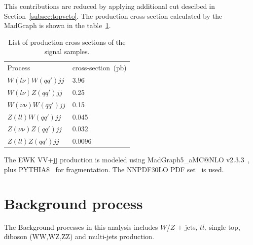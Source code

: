 This contributions are reduced by applying additional cut descibed in Section~\ref{subsec:topveto}.
The production cross-section calculated by the MadGraph is shown in the table~\ref{tab:VBS_sig_samples}.
\begin{table}[!htbp]
\begin{center}
\small
\begin{tabular}{|l|l|}
\hline
Process & cross-section~(pb) \\
$W(l\nu)W(qq\prime)jj$            &  3.96   \\
$W(l\nu)Z(qq\prime)jj$            &  0.25   \\
$W(\nu\nu)W(qq\prime)jj$          &  0.15   \\
$Z(ll)W(qq\prime)jj$              &  0.045  \\
$Z(\nu\nu)Z(qq\prime)jj$          &  0.032  \\
$Z(ll)Z(qq\prime)jj$              &  0.0096 \\
\hline
\end{tabular}
\caption{List of production cross sections of the signal samples.}
\label{tab:VBS_sig_samples}
\end{center}
\end{table}

The EWK VV+jj production is modeled using MadGraph5\_aMC@NLO v2.3.3~\cite{Alwall:2014hca}, plus PYTHIA8~\cite{Sjostrand:2007gs} for fragmentation.
The \textsc{NNPDF30LO} PDF set~\cite{Ball:2012cx} is used.



\section{Background process}
The Background processes in this analysis includes  $W$/$Z$ $\plus$ jets, $t\bar{t}$, single top, diboson (WW,WZ,ZZ) and multi-jets production. 

